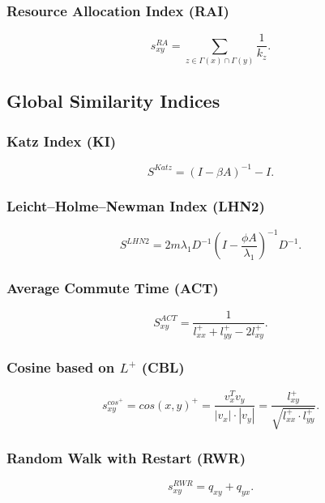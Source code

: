 \documentclass{llncs}
\begin{document}
\subsubsection{Resource Allocation Index (RAI)}
%
\begin{equation}
s_{xy}^{RA} = \sum_{z \in \Gamma(x) \cap \Gamma(y)} \frac{1}{k_z}.
\end{equation}
%
\subsection{Global Similarity Indices}
%
\subsubsection{Katz Index (KI)}
%
\begin{equation}
S^{Katz} = (I - \beta A)^{-1} - I.
\end{equation}
%
\subsubsection{Leicht–Holme–Newman Index (LHN2)}
%
\begin{equation}
S^{LHN2} = 2 m \lambda_1 D^{-1} (I - \frac{\phi A}{\lambda_1})^{-1} D^{-1}.
\end{equation}
%
\subsubsection{Average Commute Time (ACT)}
%
\begin{equation}
S_{xy}^{ACT} = \frac{1}{l_{xx}^{+} + l_{yy}^{+} - 2l_{xy}^{+}}.
\end{equation}
%
\subsubsection{Cosine based on $L^+$ (CBL)}
%
\begin{equation}
s_{xy}^{cos^{+}} = cos(x, y)^{+} = \frac{v_x^T v_y}{|v_x| \cdot |v_y|} = \frac{l_{xy}^{+}}{\sqrt{l_{xx}^{+}\cdot l_{yy}^{+}}}.
\end{equation}
%
\subsubsection{Random Walk with Restart (RWR)}
%
\begin{equation}
s_{xy}^{RWR} = q_{xy} + q_{yx}.
\end{equation}
%
\end{document}
